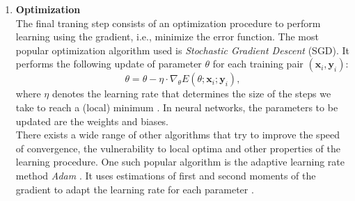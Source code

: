 \documentclass[bsc,frontabs,twoside,singlespacing,parskip,deptreport]{infthesis}     %
\begin{document}
\begin{enumerate}


     
     
    \item{ \bf{Optimization} } \\ 
    The final traning step consists of an optimization procedure to perform learning using the gradient, i.e., minimize the error function. The most popular optimization algorithm used is \textit{Stochastic Gradient Descent} (SGD). It performs the following update of parameter \(\theta\) for each training pair \((\mathbf{x}_i,\mathbf{y}_i)\):
    \begin{equation}
   \theta=\theta-\eta \cdot \nabla_{\theta} E\left(\theta ; \mathbf{x}_i ; \mathbf{y}_i\right),\end{equation}
    where \(\eta\) denotes the learning rate that determines the size of the steps we take to reach a (local) minimum \cite{ruder_overview_2017}. In neural networks, the parameters to be updated are the weights and biases.\\ There exists a wide range of other algorithms that try to improve the speed of convergence, the vulnerability to local optima and other properties of the learning procedure. One such popular algorithm is the adaptive learning rate method \textit{Adam} \cite{ruder_overview_2017}. It uses estimations of first and second moments of the gradient to adapt the learning rate for each parameter \cite{ruder_overview_2017}.
    
\end{enumerate}
\end{document}
